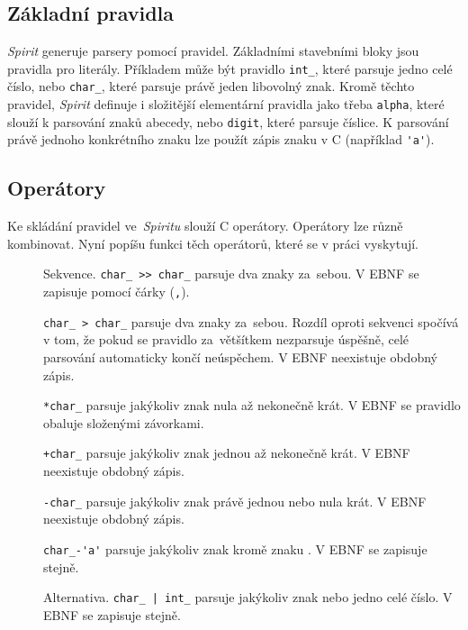 \documentclass[thesis=B,czech,hidelinks]{FITthesis}[2019/03/06]
\newcommand{\Rplus}{\protect\hspace{-.1em}\protect\raisebox{.35ex}{\smaller{\smaller\textbf{+}}}}
\newcommand{\Cpp}{\mbox{C\Rplus\Rplus}\xspace}
\begin{document}
\subsection{Základní pravidla}
\textit{Spirit} generuje parsery pomocí pravidel. Základními stavebními bloky jsou pravidla pro literály. Příkladem může být pravidlo \verb¨int_¨, které parsuje jedno celé číslo, nebo \verb¨char_¨, které parsuje právě jeden libovolný znak. Kromě těchto pravidel, \textit{Spirit} definuje i složitější elementární pravidla jako třeba \texttt{alpha}, které slouží k parsování znaků abecedy, nebo \texttt{digit}, které parsuje číslice. K parsování právě jednoho konkrétního znaku lze použít zápis znaku v \Cpp{} (například \verb¨'a'¨).

\subsection{Operátory}
Ke skládání pravidel ve~\textit{Spiritu} slouží \Cpp{} operátory. Operátory lze různě kombinovat. Nyní popíšu funkci těch operátorů, které se v práci vyskytují.
\begin{description}
    \item[\uv{\texttt{>>}}]{Sekvence. \verb¨char_ >> char_¨ parsuje dva znaky za~sebou. V EBNF se zapisuje pomocí čárky (\texttt{,}).}
    \item[\uv{\texttt{>}}]{\verb¨char_ > char_¨ parsuje dva znaky za~sebou. Rozdíl oproti sekvenci spočívá v tom, že pokud se pravidlo za~většítkem nezparsuje úspěšně, celé parsování automaticky končí neúspěchem. V EBNF neexistuje obdobný zápis.}
    \item[\uv{\texttt{*}}]{\verb¨*char_¨ parsuje jakýkoliv znak nula až nekonečně krát. V EBNF se pravidlo obaluje složenými závorkami.}
    \item[\uv{\texttt{+}}]{\verb¨+char_¨ parsuje jakýkoliv znak jednou až nekonečně krát. V EBNF ne\-existuje obdobný zápis.}
    \item[]{\verb¨-char_¨ parsuje jakýkoliv znak právě jednou nebo nula krát. V EBNF neexistuje obdobný zápis.}
    \item[]{\verb¨char_-'a'¨ parsuje jakýkoliv znak kromě znaku . V EBNF se zapisuje stejně.}
    \item[\uv{\texttt{|}}]{Alternativa. \verb¨char_ | int_¨ parsuje jakýkoliv znak nebo jedno celé číslo. V EBNF se zapisuje stejně.}
\end{description}
\end{document}
